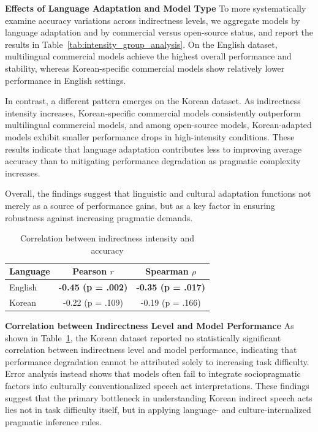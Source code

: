 \documentclass[11pt]{article}
\begin{document}
\textbf{Effects of Language Adaptation and Model Type} To more systematically examine accuracy variations across indirectness levels, we aggregate models by language adaptation and by commercial versus open-source status, and report the results in Table~\ref{tab:intensity_group_analysis}. On the English dataset, multilingual commercial models achieve the highest overall performance and stability, whereas Korean-specific commercial models show relatively lower performance in English settings.

In contrast, a different pattern emerges on the Korean dataset. As indirectness intensity increases, Korean-specific commercial models consistently outperform multilingual commercial models, and among open-source models, Korean-adapted models exhibit smaller performance drops in high-intensity conditions. These results indicate that language adaptation contributes less to improving average accuracy than to mitigating performance degradation as pragmatic complexity increases.

Overall, the findings suggest that linguistic and cultural adaptation functions not merely as a source of performance gains, but as a key factor in ensuring robustness against increasing pragmatic demands.

\begin{table}[t]
\centering
\small
\begin{tabular}{lcc}
\toprule
\textbf{Language} & \textbf{Pearson $r$} & \textbf{Spearman $\rho$} \\
\midrule
English & \textbf{-0.45 (p = .002)} & \textbf{-0.35 (p = .017)} \\
Korean  & -0.22 (p = .109)         & -0.19 (p = .166)         \\
\bottomrule
\end{tabular}
\caption{Correlation between indirectness intensity and accuracy}
\label{tab:correlation_intensity}
\end{table}
\textbf{Correlation between Indirectness Level and Model Performance} As shown in Table~\ref{tab:correlation_intensity}, the Korean dataset reported no statistically significant correlation between indirectness level and model performance, indicating that performance degradation cannot be attributed solely to increasing task difficulty. Error analysis instead shows that models often fail to integrate sociopragmatic factors into culturally conventionalized speech act interpretations. These findings suggest that the primary bottleneck in understanding Korean indirect speech acts lies not in task difficulty itself, but in applying language- and culture-internalized pragmatic inference rules.
\end{document}
